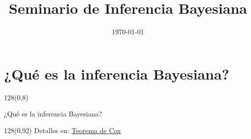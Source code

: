 \documentclass[shownotes]{beamer}
\title[Inferencia Bayesiana]{Seminario de Inferencia Bayesiana}
\institute[Bayes Buenos Aires]{\texttt{[image: ../../../aux/static/peligro\_predador]}}
\date{\today}
\begin{document}
\small

\begin{frame}[noframenumbering]
 
\maketitle
 \end{frame}
 
\section{¿Qu\'e es la inferencia Bayesiana?}

\begin{frame}
\begin{textblock}{128}(0,8)
\begin{center}
 \large ¿Qu\'e es la inferencia Bayesiana?
\end{center}
\end{textblock}

\vspace{0.75cm}
\pause


\begin{textblock}{128}(0,92)
\tiny \centering
Detalles en: \href{https://doi.org/10.1016/S0888-613X(03)00051-3}{Teorema de Cox}
\end{textblock}
 \end{frame}
 
 
% 
% 
% 
% 
%  
% 
% 
% 
%  
\end{document}
